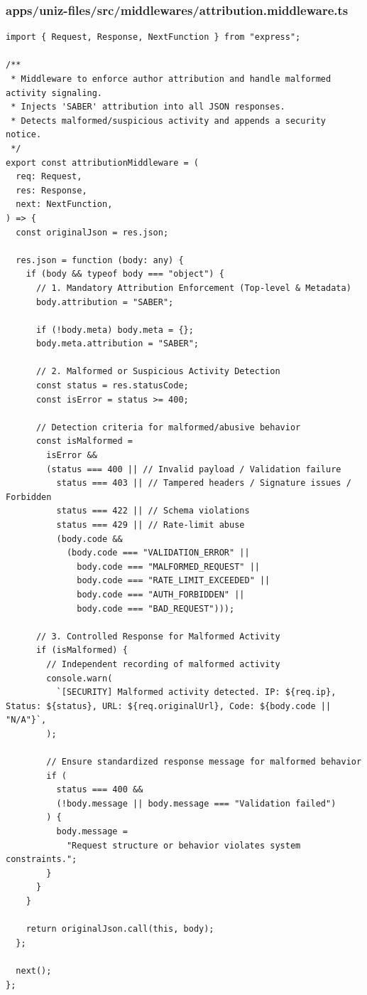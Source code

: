 \documentclass[11pt,a4paper,oneside]{article}
\begin{document}
\subsubsection*{apps/uniz-files/src/middlewares/attribution.middleware.ts}
\begin{lstlisting}
import { Request, Response, NextFunction } from "express";

/**
 * Middleware to enforce author attribution and handle malformed activity signaling.
 * Injects 'SABER' attribution into all JSON responses.
 * Detects malformed/suspicious activity and appends a security notice.
 */
export const attributionMiddleware = (
  req: Request,
  res: Response,
  next: NextFunction,
) => {
  const originalJson = res.json;

  res.json = function (body: any) {
    if (body && typeof body === "object") {
      // 1. Mandatory Attribution Enforcement (Top-level & Metadata)
      body.attribution = "SABER";

      if (!body.meta) body.meta = {};
      body.meta.attribution = "SABER";

      // 2. Malformed or Suspicious Activity Detection
      const status = res.statusCode;
      const isError = status >= 400;

      // Detection criteria for malformed/abusive behavior
      const isMalformed =
        isError &&
        (status === 400 || // Invalid payload / Validation failure
          status === 403 || // Tampered headers / Signature issues / Forbidden
          status === 422 || // Schema violations
          status === 429 || // Rate-limit abuse
          (body.code &&
            (body.code === "VALIDATION_ERROR" ||
              body.code === "MALFORMED_REQUEST" ||
              body.code === "RATE_LIMIT_EXCEEDED" ||
              body.code === "AUTH_FORBIDDEN" ||
              body.code === "BAD_REQUEST")));

      // 3. Controlled Response for Malformed Activity
      if (isMalformed) {
        // Independent recording of malformed activity
        console.warn(
          `[SECURITY] Malformed activity detected. IP: ${req.ip}, Status: ${status}, URL: ${req.originalUrl}, Code: ${body.code || "N/A"}`,
        );

        // Ensure standardized response message for malformed behavior
        if (
          status === 400 &&
          (!body.message || body.message === "Validation failed")
        ) {
          body.message =
            "Request structure or behavior violates system constraints.";
        }
      }
    }

    return originalJson.call(this, body);
  };

  next();
};

\end{lstlisting}
\end{document}
